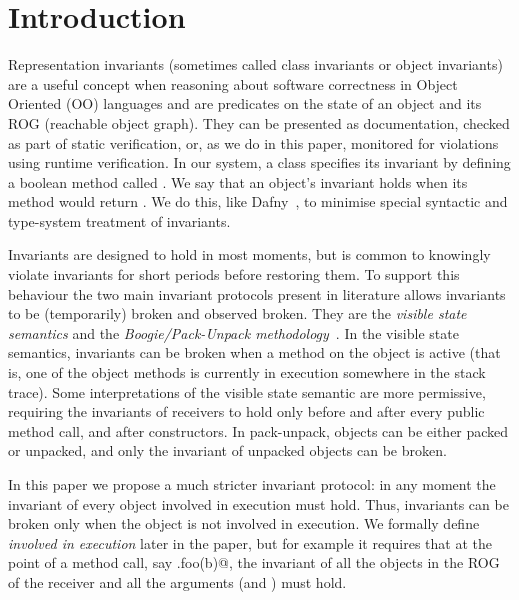 \section{Introduction}
\label{s:intro}
Representation invariants (sometimes called class invariants or object invariants) are
a useful concept when reasoning about software correctness in Object Oriented (OO) languages and are predicates on the state of an object and its ROG (reachable object graph).
They can be presented as documentation, checked as part of static verification, or, as we do in this paper, monitored for violations using runtime verification.
In our system, a class specifies its invariant by defining a boolean method called \Q@invariant@.
We say that an object's invariant holds when its \Q@invariant@ method would return \Q@true@. 
We do this, like Dafny~\cite{DBLP:conf/sigada/Leino12}, to minimise special syntactic and type-system treatment of invariants.%

Invariants are designed to hold in most moments, but 
is common to knowingly violate invariants for short periods before restoring them.
To support this behaviour the two main invariant protocols present in literature allows invariants to be (temporarily) broken and observed broken.
They are the \emph{visible state semantics} \cite{Meyer:1988:OSC:534929} and the \emph{Boogie/Pack-Unpack methodology}~\cite{DBLP:journals/jot/BarnettDFLS04}.
In the visible state semantics, invariants can be broken when a method on the object is active (that is, one of the object methods is currently in execution somewhere in the stack trace).
Some interpretations of the visible state semantic are more permissive, requiring the invariants of receivers to hold only before and after every public method call, and after constructors. 
In pack-unpack, objects can be either packed or unpacked, and only the invariant of unpacked objects can be broken.

In this paper we propose a much stricter invariant protocol: in any moment the invariant of every object involved in execution must hold.
Thus, invariants can be broken only when the object is not involved in execution. We formally define \emph{involved in execution} later in the paper, but for example it requires that at the point of a method call, say \Q@a.foo(b)@, the invariant of all the objects in the ROG of the receiver and all the arguments (\Q@a@ and \Q@b@) must hold.

